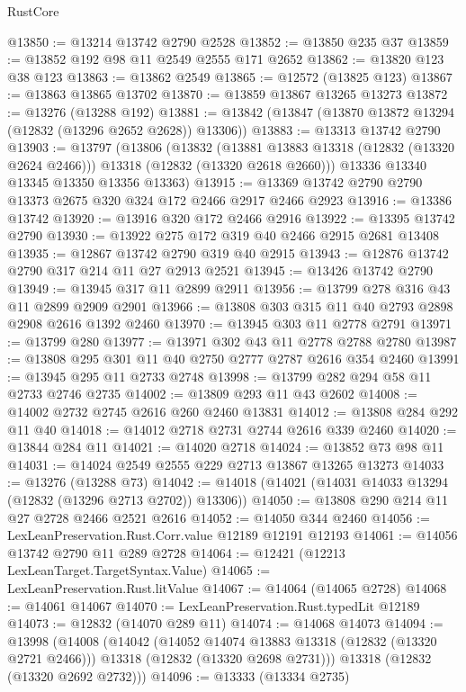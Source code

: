\begin{lexlean}{RustCore}
\begin{coremodule}
@13850 := @13214 @13742 @2790 @2528
@13852 := @13850 @235 @37
@13859 := @13852 @192 @98 @11 @2549 @2555 @171 @2652
@13862 := @13820 @123 @38 @123
@13863 := @13862 @2549
@13865 := @12572 (@13825 @123)
@13867 := @13863 @13865 @13702
@13870 := @13859 @13867 @13265 @13273
@13872 := @13276 (@13288 @192)
@13881 := @13842 (@13847 (@13870 @13872 @13294 (@12832 (@13296 @2652 @2628)) @13306))
@13883 := @13313 @13742 @2790
@13903 := @13797
    (@13806
      (@13832
        (@13881 @13883 @13318 (@12832 (@13320 @2624 @2466)))
        @13318
        (@12832 (@13320 @2618 @2660)))
      @13336
      @13340
      @13345
      @13350
      @13356
      @13363)
@13915 := @13369 @13742 @2790 @2790 @13373 @2675 @320 @324 @172 @2466 @2917 @2466 @2923
@13916 := @13386 @13742
@13920 := @13916 @320 @172 @2466 @2916
@13922 := @13395 @13742 @2790
@13930 := @13922 @275 @172 @319 @40 @2466 @2915 @2681 @13408
@13935 := @12867 @13742 @2790 @319 @40 @2915
@13943 := @12876 @13742 @2790 @317 @214 @11 @27 @2913 @2521
@13945 := @13426 @13742 @2790
@13949 := @13945 @317 @11 @2899 @2911
@13956 := @13799 @278 @316 @43 @11 @2899 @2909 @2901
@13966 := @13808 @303 @315 @11 @40 @2793 @2898 @2908 @2616 @1392 @2460
@13970 := @13945 @303 @11 @2778 @2791
@13971 := @13799 @280
@13977 := @13971 @302 @43 @11 @2778 @2788 @2780
@13987 := @13808 @295 @301 @11 @40 @2750 @2777 @2787 @2616 @354 @2460
@13991 := @13945 @295 @11 @2733 @2748
@13998 := @13799 @282 @294 @58 @11 @2733 @2746 @2735
@14002 := @13809 @293 @11 @43 @2602
@14008 := @14002 @2732 @2745 @2616 @260 @2460 @13831
@14012 := @13808 @284 @292 @11 @40
@14018 := @14012 @2718 @2731 @2744 @2616 @339 @2460
@14020 := @13844 @284 @11
@14021 := @14020 @2718
@14024 := @13852 @73 @98 @11
@14031 := @14024 @2549 @2555 @229 @2713 @13867 @13265 @13273
@14033 := @13276 (@13288 @73)
@14042 := @14018 (@14021 (@14031 @14033 @13294 (@12832 (@13296 @2713 @2702)) @13306))
@14050 := @13808 @290 @214 @11 @27 @2728 @2466 @2521 @2616
@14052 := @14050 @344 @2460
@14056 := LexLeanPreservation.Rust.Corr.value @12189 @12191 @12193
@14061 := @14056 @13742 @2790 @11 @289 @2728
@14064 := @12421 (@12213 LexLeanTarget.TargetSyntax.Value)
@14065 := LexLeanPreservation.Rust.litValue
@14067 := @14064 (@14065 @2728)
@14068 := @14061 @14067
@14070 := LexLeanPreservation.Rust.typedLit @12189
@14073 := @12832 (@14070 @289 @11)
@14074 := @14068 @14073
@14094 := @13998
    (@14008
      (@14042
        (@14052 @14074 @13883 @13318 (@12832 (@13320 @2721 @2466)))
        @13318
        (@12832 (@13320 @2698 @2731)))
      @13318
      (@12832 (@13320 @2692 @2732)))
@14096 := @13333 (@13334 @2735)

\end{coremodule}
\end{lexlean}
